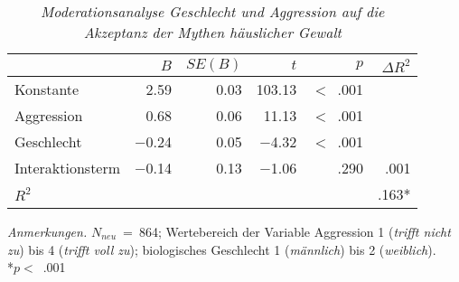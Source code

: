 \begin{table}[htb]
    \caption[Moderationsanalyse Geschlecht und Aggression auf die Akzeptanz der Mythen häuslicher Gewalt]{\textit {Moderationsanalyse Geschlecht und Aggression auf die Akzeptanz der Mythen häuslicher Gewalt}} 
    \label{Moderationsanalyse}
    \centering
    \begin{adjustbox}{width=11cm} %
    \small
    \begin{tabular}{lrrrrr}
      \hline
      & $B$    & $SE(B)$  & $t$    & $p$ & $\Delta R^{2}$\\
      \hline
    Konstante  & 2.59    & 0.03 & 103.13  & $<$~.001 & \\
    Aggression & 0.68    & 0.06 & 11.13   & $<$~.001 & \\
    Geschlecht & $-$0.24 & 0.05 & $-$4.32 & $<$~.001 & \\
    Interaktionsterm & $-$0.14 & 0.13 & $-$1.06 & .290 & .001 \\
    $R^{2}$          &         &      &         &      & .163* \\
       \hline
    \end{tabular}
    \end{adjustbox}
    
    \begin{tablenotes}
        \item \textit{Anmerkungen.} \( N_{neu} \)~=~864; Wertebereich der Variable Aggression 1 (\textit{trifft nicht zu}) bis 4 (\textit{trifft voll zu}); biologisches Geschlecht 1 (\textit{männlich}) bis 2 (\textit{weiblich}).\\ *$p<$~.001
      \end{tablenotes}
    \end{table}



